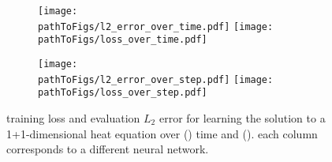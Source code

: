 \begin{figure}[!h]
  \centering
  \def\pathToFigs{kfac_pinns_exp/exp24_heat1d_groupplot}
  \begin{subfigure}[t]{1.0\linewidth}
    \caption{}\label{subfig:heat1d-time}
    \texttt{[image: \\pathToFigs/l2\_error\_over\_time.pdf]}
    \texttt{[image: \\pathToFigs/loss\_over\_time.pdf]}
  \end{subfigure}
  \begin{subfigure}[t]{1.0\linewidth}
    \caption{}\label{subfig:heat1d-step}
    \texttt{[image: \\pathToFigs/l2\_error\_over\_step.pdf]}
    \texttt{[image: \\pathToFigs/loss\_over\_step.pdf]}
  \end{subfigure}
  \caption{training loss and evaluation $L_2$ error for learning the solution to a 1+1-dimensional heat equation over () time and (). each column corresponds to a different neural network.}\label{fig:heat1d-appendix}
\end{figure}

